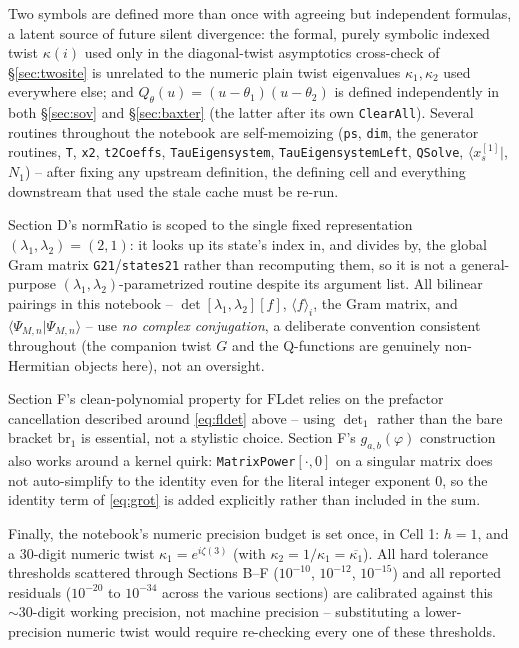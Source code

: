 \documentclass[11pt]{article}
\newcommand{\qth}{Q_\theta}
\begin{document}
Two symbols are defined more than once with agreeing but independent formulas, a latent source of
future silent divergence: the formal, purely symbolic indexed twist $\kappa(i)$ used only in the
diagonal-twist asymptotics cross-check of \S\ref{sec:twosite} is unrelated to the numeric plain
twist eigenvalues $\kappa_1,\kappa_2$ used everywhere else; and $\qth(u)=(u-\theta_1)(u-\theta_2)$
is defined independently in both \S\ref{sec:sov} and \S\ref{sec:baxter} (the latter after its own
\texttt{ClearAll}). Several routines throughout the notebook are self-memoizing
(\texttt{ps}, \texttt{dim}, the generator routines, \texttt{T}, \texttt{x2}, \texttt{t2Coeffs},
\texttt{TauEigensystem}, \texttt{TauEigensystemLeft}, \texttt{QSolve}, $\langle x^{[1]}_s|$,
$N_1$) -- after fixing any upstream definition, the defining cell and everything downstream that
used the stale cache must be re-run.

Section D's $\mathrm{normRatio}$ is scoped to the single fixed representation
$(\lambda_1,\lambda_2)=(2,1)$: it looks up its state's index in, and divides by, the global Gram
matrix \texttt{G21}/\texttt{states21} rather than recomputing them, so it is not a general-purpose
$(\lambda_1,\lambda_2)$-parametrized routine despite its argument list. All bilinear pairings in
this notebook -- $\det[\lambda_1,\lambda_2][f]$, $\langle f\rangle_i$, the Gram matrix, and
$\langle\Psi_{M,n}|\Psi_{M,n}\rangle$ -- use \emph{no complex conjugation}, a deliberate convention
consistent throughout (the companion twist $G$ and the Q-functions are genuinely non-Hermitian
objects here), not an oversight.

Section F's clean-polynomial property for $\mathrm{FLdet}$ relies on the prefactor cancellation
described around \eqref{eq:fldet} above -- using $\det_1$ rather than the bare bracket
$\mathrm{br}_1$ is essential, not a stylistic choice. Section F's $g_{a,b}(\varphi)$ construction
also works around a kernel quirk: \texttt{MatrixPower}$[\cdot,0]$ on a singular matrix does not
auto-simplify to the identity even for the literal integer exponent $0$, so the identity term of
\eqref{eq:grot} is added explicitly rather than included in the sum.

Finally, the notebook's numeric precision budget is set once, in Cell 1: $h=1$, and a 30-digit
numeric twist $\kappa_1=e^{i\zeta(3)}$ (with $\kappa_2=1/\kappa_1=\overline{\kappa_1}$). All hard
tolerance thresholds scattered through Sections B--F ($10^{-10}$, $10^{-12}$, $10^{-15}$) and all
reported residuals ($10^{-20}$ to $10^{-34}$ across the various sections) are calibrated against
this $\sim30$-digit working precision, not machine precision -- substituting a lower-precision
numeric twist would require re-checking every one of these thresholds.
\end{document}
